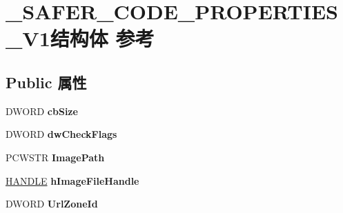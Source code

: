 \hypertarget{struct___s_a_f_e_r___c_o_d_e___p_r_o_p_e_r_t_i_e_s___v1}{}\section{\+\_\+\+S\+A\+F\+E\+R\+\_\+\+C\+O\+D\+E\+\_\+\+P\+R\+O\+P\+E\+R\+T\+I\+E\+S\+\_\+\+V1结构体 参考}
\label{struct___s_a_f_e_r___c_o_d_e___p_r_o_p_e_r_t_i_e_s___v1}
\subsection*{Public 属性}
\begin{DoxyCompactItemize}
\item 
\mbox{\label{struct___s_a_f_e_r___c_o_d_e___p_r_o_p_e_r_t_i_e_s___v1_aeda69873409b1dabac815df6180bad89}} 
D\+W\+O\+RD {\bfseries cb\+Size}
\item 
\mbox{\label{struct___s_a_f_e_r___c_o_d_e___p_r_o_p_e_r_t_i_e_s___v1_a2431ce8de2c747db567145da8403c166}} 
D\+W\+O\+RD {\bfseries dw\+Check\+Flags}
\item 
\mbox{\label{struct___s_a_f_e_r___c_o_d_e___p_r_o_p_e_r_t_i_e_s___v1_afcde3fda42594fc0e416d746013f1799}} 
P\+C\+W\+S\+TR {\bfseries Image\+Path}
\item 
\mbox{\label{struct___s_a_f_e_r___c_o_d_e___p_r_o_p_e_r_t_i_e_s___v1_a033321eb46c1b62b6641296e29a1de7d}} 
\hyperlink{interfacevoid}{H\+A\+N\+D\+LE} {\bfseries h\+Image\+File\+Handle}
\item 
\mbox{\label{struct___s_a_f_e_r___c_o_d_e___p_r_o_p_e_r_t_i_e_s___v1_a87aca749fd1f2d2986c5e3192ff53d36}} 
D\+W\+O\+RD {\bfseries Url\+Zone\+Id}
\item 
\mbox{\label{struct___s_a_f_e_r___c_o_d_e___p_r_o_p_e_r_t_i_e_s___v1_ac959242a8df0490a5cfeb57215e5957e}} 

\end{DoxyCompactItemize}
